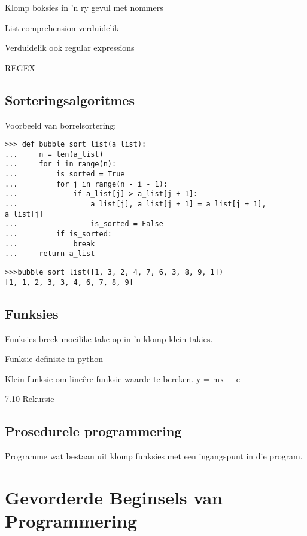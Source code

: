 Klomp boksies in 'n ry gevul met nommers


List comprehension verduidelik

Verduidelik ook regular expressions

REGEX

\chapter[Sortering]
{Sorteringsalgoritmes}

Voorbeeld van borrelsortering:

\lstset{language=Python}
\lstset{frame=lines}
\lstset{basicstyle=\footnotesize}
\begin{lstlisting}
>>> def bubble_sort_list(a_list):
...     n = len(a_list)
...     for i in range(n):
...         is_sorted = True
...         for j in range(n - i - 1):
...             if a_list[j] > a_list[j + 1]:
...                 a_list[j], a_list[j + 1] = a_list[j + 1], a_list[j]
...                 is_sorted = False
...         if is_sorted:
...             break
...     return a_list
\end{lstlisting}


\begin{lstlisting}[style=DOS]
>>>bubble_sort_list([1, 3, 2, 4, 7, 6, 3, 8, 9, 1])
[1, 1, 2, 3, 3, 4, 6, 7, 8, 9]
\end{lstlisting}


\chapter[Funksies]
{Funksies}


Funksies breek moeilike take op in 'n klomp klein takies.

Funksie definisie in python

Klein funksie om line\^{e}re funksie waarde te bereken. y = mx + c


7.10  Rekursie

\chapter[Prosedurele programmering]
{Prosedurele programmering}


Programme wat bestaan uit klomp funksies met een ingangspunt in die program.

\part[Gevorderde Beginsels]
{Gevorderde Beginsels van\\ Programmering}

